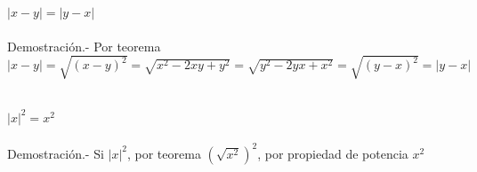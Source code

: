 \begin{teo}
$|x-y|=|y-x|$\\\\
Demostración.- \; Por teorema $|x-y|=\sqrt{(x-y)^2}=\sqrt{x^2-2xy+y^2}=\sqrt{y^2-2yx+x^2}=\sqrt{(y-x)^2}=|y-x|$\\\\ 
\end{teo}

\begin{teo}
$|x|^2=x^2$\\\\
Demostración.- \; Si $|x|^2$, por teorema $\left( \sqrt{x^2} \right)^2$, por propiedad de potencia $x^2$\\\\
\end{teo}
